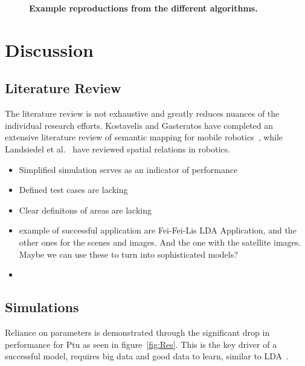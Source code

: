 \documentclass[twocolumn,letterpaper]{IEEEAerospaceCLS}  %
\begin{document}
\begin{figure}
    \centering
    \caption{\bf{
        Example reproductions from the different algorithms. 
    }}
    \label{fig:SampRes}
\end{figure}
\section{Discussion} \label{sec:Disc}
\subsection{Literature Review} \label{ssec:DiscLit}
The literature review is not exhaustive and greatly reduces nuances of the individual research efforts. Kostavelis and Gasteratos have completed an extensive literature review of semantic mapping for mobile robotics~\cite{kostavelis_semantic_2015}, while Landsiedel et al.~\cite{landsiedel_review_2017} have reviewed spatial relations in robotics.
\begin{itemize}
    \item Simplified simulation serves as an indicator of performance
    \item Defined test cases are lacking
    \item Clear definitons of areas are lacking
    \item example of successful application are Fei-Fei-Lis LDA Application, and the other ones for the scenes and images. And the one with the satellite images. Maybe we can use these to turn into sophisticated models?
    \item 
\end{itemize}

\subsection{Simulations} \label{ssec:DiscSim}
Reliance on parameters is demonstrated through the significant drop in performance for Ptu as seen in figure~\ref{fig:Res}. This is the key driver of a successful model, requires big data and good data to learn, similar to LDA~\cite{blei_latent_2003}. 
\end{document}
